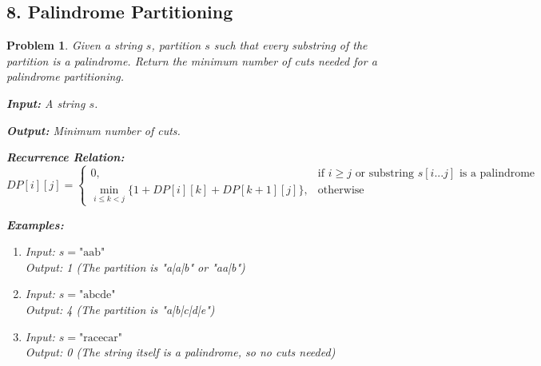 \documentclass{article}
\newtheorem{problem}{Problem}
\begin{document}
\subsection*{8. Palindrome Partitioning}
\begin{problem}
Given a string $s$, partition $s$ such that every substring of the partition is a palindrome. Return the minimum number of cuts needed for a palindrome partitioning.

\textbf{Input:} A string $s$.

\textbf{Output:} Minimum number of cuts.

\textbf{Recurrence Relation:}
\[
DP[i][j] = 
\begin{cases}
0, & \text{if } i \geq j \text{ or substring } s[i...j] \text{ is a palindrome} \\
\min_{i \leq k < j} \{1 + DP[i][k] + DP[k+1][j]\}, & \text{otherwise}
\end{cases}
\]

\textbf{Examples:}
\begin{enumerate}
\item Input: $s = \text{"aab"}$ \\
      Output: 1 (The partition is "a|a|b" or "aa|b")
\item Input: $s = \text{"abcde"}$ \\
      Output: 4 (The partition is "a|b|c|d|e")
\item Input: $s = \text{"racecar"}$ \\
      Output: 0 (The string itself is a palindrome, so no cuts needed)
\end{enumerate}
\end{problem}

\end{document}
